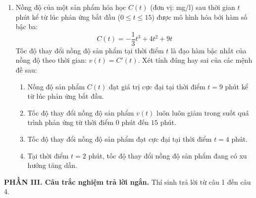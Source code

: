 \documentclass[12pt]{article}
\begin{document}
\begin{enumerate}[label=\textbf{Câu \arabic*.}, leftmargin=*]
\begin{center}
		\end{center}
		Xét tính đúng hay sai của các mệnh đề sau:
		\begin{enumerate}[label=\alph*)]
			\item Hàm số luôn đồng biến trên tập xác định $\mathbb{R} \setminus \{-1\}$.
			\item Đồ thị hàm số nhận giao điểm hai đường tiệm cận $I(-1; 2)$ làm tâm đối xứng.
			\item Giao điểm của đồ thị hàm số với trục hoành có hoành độ bằng $0{,}5$.
			\item Đường tiệm cận ngang của đồ thị hàm số là đường thẳng $y = 2$.
		\end{enumerate}
		
		\vspace{4mm}
		\item Nồng độ của một sản phẩm hóa học $C(t)$ (đơn vị: mg/l) sau thời gian $t$ phút kể từ lúc phản ứng bắt đầu ($0 \le t \le 15$) được mô hình hóa bởi hàm số bậc ba:
		\[ C(t) = -\dfrac{1}{3}t^3 + 4t^2 + 9t \]
		Tốc độ thay đổi nồng độ sản phẩm tại thời điểm $t$ là đạo hàm bậc nhất của nồng độ theo thời gian: $v(t) = C'(t)$. Xét tính đúng hay sai của các mệnh đề sau:
		\begin{enumerate}[label=\alph*)]
			\item Nồng độ sản phẩm $C(t)$ đạt giá trị cực đại tại thời điểm $t = 9$ phút kể từ lúc phản ứng bắt đầu.
			\item Tốc độ thay đổi nồng độ sản phẩm $v(t)$ luôn luôn giảm trong suốt quá trình phản ứng từ thời điểm $0$ phút đến $15$ phút.
			\item Tốc độ thay đổi nồng độ sản phẩm đạt cực đại tại thời điểm $t = 4$ phút.
			\item Tại thời điểm $t = 2$ phút, tốc độ thay đổi nồng độ sản phẩm đang có xu hướng tăng dần.
		\end{enumerate}
		
	\end{enumerate}
	
	\vspace{6mm}
	\noindent\textbf{PHẦN III. Câu trắc nghiệm trả lời ngắn.} Thí sinh trả lời từ câu 1 đến câu 4.
	\vspace{3mm}
	
\end{document}
